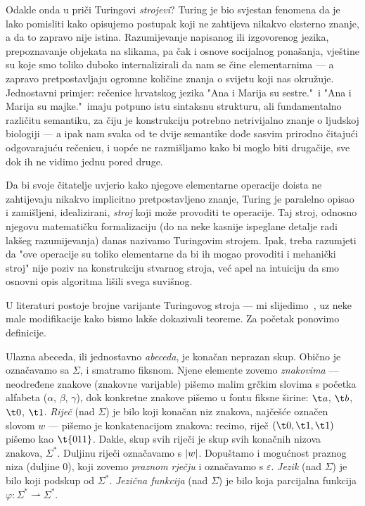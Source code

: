 Odakle onda u priči Turingovi \emph{strojevi}? Turing je bio svjestan fenomena da je lako pomisliti kako opisujemo postupak koji ne zahtijeva nikakvo eksterno znanje, a da to zapravo nije istina. Razumijevanje napisanog ili izgovorenog jezika, prepoznavanje objekata na slikama, pa čak i osnove socijalnog ponašanja, vještine su koje smo toliko duboko internalizirali da nam se čine elementarnima --- a zapravo pretpostavljaju ogromne količine znanja o svijetu koji nas okružuje. Jednostavni primjer: rečenice hrvatskog jezika "Ana i Marija su sestre."\ i "Ana i Marija su majke."\ imaju potpuno istu sintaksnu strukturu, ali fundamentalno različitu semantiku, za čiju je konstrukciju potrebno netrivijalno znanje o ljudskoj biologiji --- a ipak nam svaka od te dvije semantike dođe sasvim prirodno čitajući odgovarajuću rečenicu, i uopće ne razmišljamo kako bi moglo biti drugačije, sve dok ih ne vidimo jednu pored druge.

Da bi svoje čitatelje uvjerio kako njegove elementarne operacije doista ne zahtijevaju nikakvo implicitno pretpostavljeno znanje, Turing je paralelno opisao i zamišljeni, idealizirani, \emph{stroj} koji može provoditi te operacije. Taj stroj, odnosno njegovu matematičku formalizaciju (do na neke kasnije ispeglane detalje radi lakšeg razumijevanja) danas nazivamo Turingovim strojem. Ipak, treba razumjeti da "ove operacije su toliko elementarne da bi ih mogao provoditi i mehanički stroj" nije poziv na konstrukciju stvarnog stroja, već apel na intuiciju da smo osnovni opis algoritma lišili svega suvišnog.

U literaturi postoje brojne varijante Turingovog stroja --- mi slijedimo~\cite{sipser}, uz neke male modifikacije kako bismo lakše dokazivali teoreme. Za početak ponovimo definicije.

Ulazna abeceda, ili jednostavno \emph{abeceda}, je konačan neprazan skup. Obično je označavamo sa $\Sigma$, i smatramo fiksnom. Njene elemente zovemo \emph{znakovima} --- ne\-od\-re\-đe\-ne znakove (znakovne varijable) pišemo malim grčkim slovima s početka alfabeta ($\alpha$, $\beta$, $\gamma$), dok konkretne znakove pišemo u fontu fiksne širine: $\t a$, $\t b$, $\t 0$, $\t 1$. \emph{Riječ} (nad $\Sigma$) je bilo koji konačan niz znakova, najčešće označen slovom $w$ --- pišemo je konkatenacijom znakova: recimo, riječ $(\t0,\t1,\t1)$ pišemo kao $\t{011}$. Dakle, skup svih riječi je skup svih konačnih nizova znakova, $\Sigma^*$. Duljinu riječi označavamo s $\lvert w\rvert$. Dopuštamo i mogućnost praznog niza (duljine $0$), koji zovemo \emph{praznom rječju} i označavamo s $\varepsilon$. \emph{Jezik} (nad $\Sigma$) je bilo koji podskup od $\Sigma^*$. \emph{Jezična funkcija} (nad $\Sigma$) je bilo koja parcijalna funkcija $\varphi:\Sigma^*\rightharpoonup\Sigma^*$.

